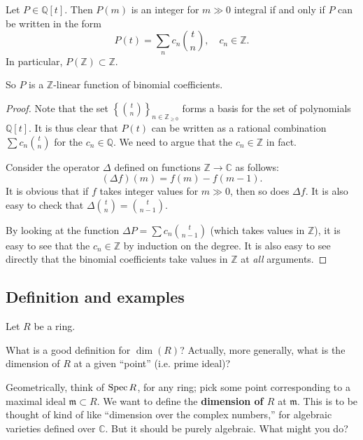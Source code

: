 \begin{proposition}\label{integervalued} 
Let $P \in \mathbb{Q}[t]$. Then $P(m)$ is an integer for $m \gg 0$ integral if and only if
$P$ can be written in the form
\[ P(t) = \sum_n c_n \binom{t}{n}, \quad c_n \in \mathbb{Z}.  \]
In particular, $P(\mathbb{Z}) \subset \mathbb{Z}$.
\end{proposition} 
So $P$ is a $\mathbb{Z}$-linear function of binomial coefficients. 
\begin{proof} 
Note that the set $\left\{\binom{t}{n}\right\}_{n \in \mathbb{Z}_{\geq 0}}$ forms a basis for the set of
polynomials $\mathbb{Q}[t]$. It is thus clear that $P(t)$ can be written as
a rational combination $\sum c_n \binom{t}{n}$ for the $c_n \in \mathbb{Q}$.
We need to argue that the $c_n \in \mathbb{Z}$ in fact.

Consider the operator $\Delta$ defined on functions $\mathbb{Z} \to
\mathbb{C}$ as follows:
\[( \Delta f)(m) = f(m) - f(m-1).  \]
It is obvious that if $f$ takes integer values for $m \gg 0$, then so does
$\Delta f$. It is also easy to check that $\Delta \binom{t}{n} =
\binom{t}{n-1}$.

By looking at the
function $\Delta P = \sum c_n \binom{t}{n-1}$ (which takes values in $\mathbb{Z}$), it is easy to see that the $c_n \in \mathbb{Z}$ by induction
on the degree. 
It is also easy to see directly that the binomial coefficients take values in
$\mathbb{Z}$ at \emph{all} arguments.
\end{proof} 



\subsection{Definition and examples}
Let $R$ be a   ring. 
\begin{question} 
What is a good definition for $\dim(R)$? Actually, more generally, 
what is the dimension of $R$ at a given ``point'' (i.e. prime ideal)?
\end{question} 

Geometrically, think of $\operatorname{Spec} R$, for any ring; pick some point corresponding to a maximal
ideal $\mathfrak{m} \subset R$. We want to define the \textbf{dimension of $R$}
at $\mathfrak{m}$. This is to be thought of kind of like ``dimension over the
complex numbers,'' for algebraic varieties defined over $\mathbb{C}$. But it
should be purely algebraic. 
What might you do?


